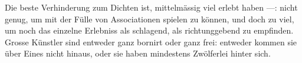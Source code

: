Die beste Verhinderung zum Dichten ist, mittelmässig viel erlebt haben —: nicht genug, um mit der Fülle von Associationen spielen zu können, und doch zu viel, um noch das einzelne Erlebniss als schlagend, als richtunggebend zu empfinden. Grosse Künstler sind entweder ganz bornirt oder ganz frei: entweder kommen sie über Eines nicht hinaus, oder sie haben mindestens Zwölferlei hinter sich.
\par

